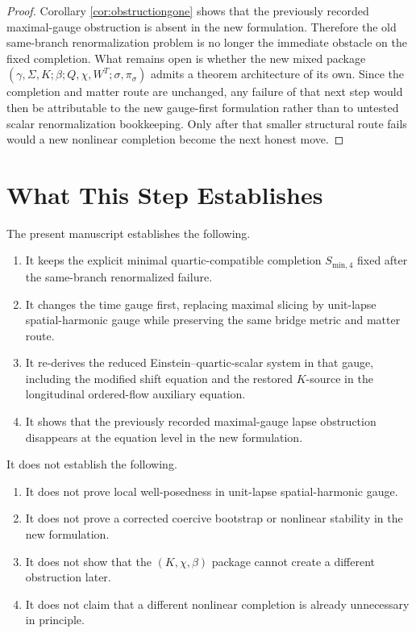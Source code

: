\documentclass[11pt]{article}
\begin{document}
\begin{proof}
Corollary \ref{cor:obstructiongone} shows that the previously recorded maximal-gauge obstruction is absent in the new formulation. Therefore the old same-branch renormalization problem is no longer the immediate obstacle on the fixed completion. What remains open is whether the new mixed package \((\gamma,\Sigma,K;\beta;Q,\chi,W^T;\sigma,\pi_\sigma)\) admits a theorem architecture of its own. Since the completion and matter route are unchanged, any failure of that next step would then be attributable to the new gauge-first formulation rather than to untested scalar renormalization bookkeeping. Only after that smaller structural route fails would a new nonlinear completion become the next honest move.
\end{proof}

\section{What This Step Establishes}

The present manuscript establishes the following.
\begin{enumerate}
    \item It keeps the explicit minimal quartic-compatible completion \(S_{\mathrm{min},4}\) fixed after the same-branch renormalized failure.
    \item It changes the time gauge first, replacing maximal slicing by unit-lapse spatial-harmonic gauge while preserving the same bridge metric and matter route.
    \item It re-derives the reduced Einstein--quartic-scalar system in that gauge, including the modified shift equation and the restored \(K\)-source in the longitudinal ordered-flow auxiliary equation.
    \item It shows that the previously recorded maximal-gauge lapse obstruction disappears at the equation level in the new formulation.
\end{enumerate}

It does not establish the following.
\begin{enumerate}
    \item It does not prove local well-posedness in unit-lapse spatial-harmonic gauge.
    \item It does not prove a corrected coercive bootstrap or nonlinear stability in the new formulation.
    \item It does not show that the \((K,\chi,\beta)\) package cannot create a different obstruction later.
    \item It does not claim that a different nonlinear completion is already unnecessary in principle.
\end{enumerate}
\end{document}
